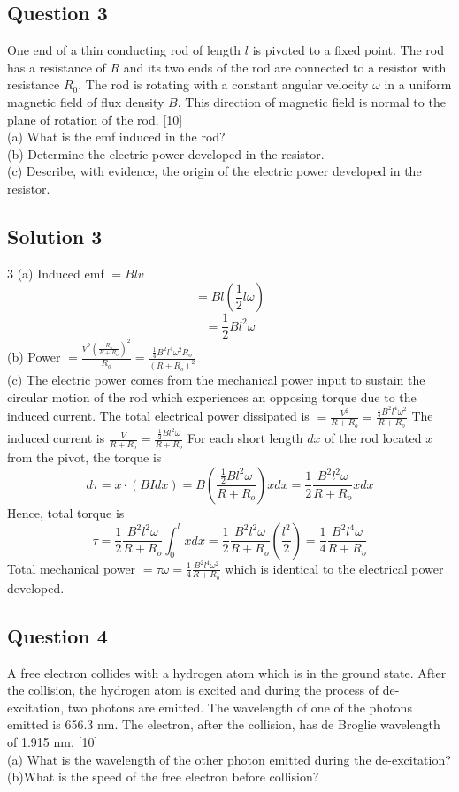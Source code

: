 \documentclass{article}
\begin{document}
\subsection{Question 3}
One end of a thin conducting rod of length $l$ is pivoted to a fixed point. The rod has a resistance of $R$ and its two ends of the rod are connected to a resistor with resistance $R_0$. The rod is rotating with a constant angular velocity $\omega$ in a uniform magnetic field of flux density $B$. This direction of magnetic field is normal to the plane of rotation of the rod. [10]\\
(a) What is the emf induced in the rod? \\
(b) Determine the electric power developed in the resistor. \\
(c) Describe, with evidence, the origin of the electric power developed in the resistor.

\subsection{Solution 3}
3 (a) Induced emf $=B l v$
$$
=B l\left(\frac{1}{2} l \omega\right)
$$
$$
=\frac{1}{2} B l^{2} \omega
$$
(b) Power $=\frac{V^{2}\left(\frac{R_{o}}{R+R_{o}}\right)^{2}}{R_{o}}=\frac{\frac{1}{4} B^{2} l^{4} \omega^{2} R_{o}}{\left(R+R_{o}\right)^{2}}$ \\
(c) The electric power comes from the mechanical power input to sustain the circular motion of the rod which experiences an opposing torque due to the induced current.
The total electrical power dissipated is $=\frac{V^{2}}{R+R_{o}}=\frac{\frac{1}{4} B^{2} l^{4} \omega^{2}}{R+R_{o}}$
The induced current is $\frac{V}{R+R_{o}}=\frac{\frac{1}{2} B l^{2} \omega}{R+R_{o}}$
For each short length $d x$ of the rod located $x$ from the pivot, the torque is
$$
d \tau=x \cdot(B I d x)=B\left(\frac{\frac{1}{2} B l^{2} \omega}{R+R_{o}}\right) x d x=\frac{1}{2} \frac{B^{2} l^{2} \omega}{R+R_{o}} x d x
$$
Hence, total torque is
$$
\tau=\frac{1}{2} \frac{B^{2} l^{2} \omega}{R+R_{o}} \int_{0}^{l} x d x=\frac{1}{2} \frac{B^{2} l^{2} \omega}{R+R_{o}}\left(\frac{l^{2}}{2}\right)=\frac{1}{4} \frac{B^{2} l^{4} \omega}{R+R_{o}}
$$
Total mechanical power $=\tau \omega=\frac{1}{4} \frac{B^{2} l^{4} \omega^{2}}{R+R_{o}}$ which is identical to the electrical power developed.

\subsection{Question 4}
A free electron collides with a hydrogen atom which is in the ground state. After the collision, the hydrogen atom is excited and during the process of de-excitation, two photons are emitted. The wavelength of one of the photons emitted is 656.3 nm. The electron, after the collision, has de Broglie wavelength of 1.915 nm. [10] \\
(a) What is the wavelength of the other photon emitted during the de-excitation? \\
(b)What is the speed of the free electron before collision?
\end{document}
